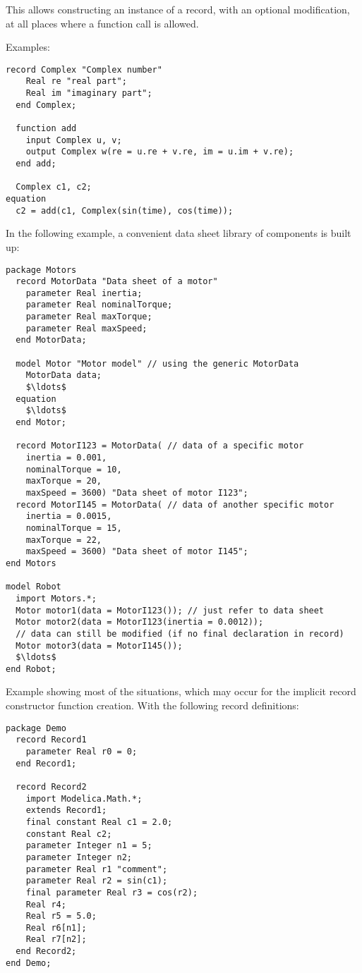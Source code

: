 \begin{nonnormative}
This allows constructing an instance of a record, with an
optional modification, at all places where a function call is allowed.

Examples:
\begin{lstlisting}[language=modelica]
  record Complex "Complex number"
    Real re "real part";
    Real im "imaginary part";
  end Complex;

  function add
    input Complex u, v;
    output Complex w(re = u.re + v.re, im = u.im + v.re);
  end add;

  Complex c1, c2;
equation
  c2 = add(c1, Complex(sin(time), cos(time));
\end{lstlisting}

In the following example, a convenient data sheet library of
components is built up:
\begin{lstlisting}[language=modelica]
package Motors
  record MotorData "Data sheet of a motor"
    parameter Real inertia;
    parameter Real nominalTorque;
    parameter Real maxTorque;
    parameter Real maxSpeed;
  end MotorData;

  model Motor "Motor model" // using the generic MotorData
    MotorData data;
    $\ldots$
  equation
    $\ldots$
  end Motor;

  record MotorI123 = MotorData( // data of a specific motor
    inertia = 0.001,
    nominalTorque = 10,
    maxTorque = 20,
    maxSpeed = 3600) "Data sheet of motor I123";
  record MotorI145 = MotorData( // data of another specific motor
    inertia = 0.0015,
    nominalTorque = 15,
    maxTorque = 22,
    maxSpeed = 3600) "Data sheet of motor I145";
end Motors

model Robot
  import Motors.*;
  Motor motor1(data = MotorI123()); // just refer to data sheet
  Motor motor2(data = MotorI123(inertia = 0.0012));
  // data can still be modified (if no final declaration in record)
  Motor motor3(data = MotorI145());
  $\ldots$
end Robot;
\end{lstlisting}

Example showing most of the situations, which may occur for the
implicit record constructor function creation. With the following record
definitions:
\begin{lstlisting}[language=modelica]
package Demo
  record Record1
    parameter Real r0 = 0;
  end Record1;

  record Record2
    import Modelica.Math.*;
    extends Record1;
    final constant Real c1 = 2.0;
    constant Real c2;
    parameter Integer n1 = 5;
    parameter Integer n2;
    parameter Real r1 "comment";
    parameter Real r2 = sin(c1);
    final parameter Real r3 = cos(r2);
    Real r4;
    Real r5 = 5.0;
    Real r6[n1];
    Real r7[n2];
  end Record2;
end Demo;
\end{lstlisting}


\end{nonnormative}
